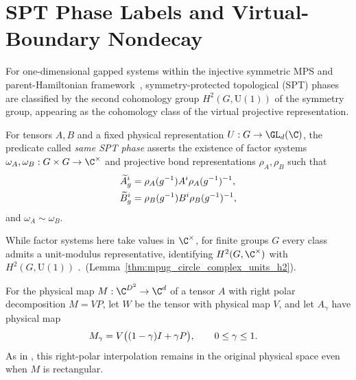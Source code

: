 \section{SPT Phase Labels and Virtual-Boundary Nondecay}

For one-dimensional gapped systems within the injective symmetric MPS and
parent-Hamiltonian framework~\cite{Schuch2011Phases}, symmetry-protected
topological (SPT) phases are classified by the second cohomology group
$H^2(G,\mathrm{U}(1))$ of the symmetry group, appearing as the cohomology class
of the virtual projective representation.

\begin{definition}
    \label{def:is_same_spt_phase}
    \leanok
    For tensors $A,B$ and a fixed physical representation
    $U:G\to\GL_d(\C)$, the predicate called \emph{same SPT phase}
    asserts the existence of factor systems
    $\omega_A,\omega_B:G\times G\to\C^\times$ and projective bond
    representations $\rho_A,\rho_B$ such that
    \begin{align}
        \widetilde A_g^i
         & =\rho_A(g^{-1})A^i\rho_A(g^{-1})^{-1}, \\
        \widetilde B_g^i
         & =\rho_B(g^{-1})B^i\rho_B(g^{-1})^{-1},
        \notag
    \end{align}
    and $\omega_A\sim\omega_B$.
\end{definition}

\begin{remark}
    \label{rem:spt_scalar_character_conventions}
    While factor systems here take values in $\C^\times$, for finite groups $G$
    every class admits a unit-modulus representative, identifying
    $H^2(G,\C^\times)$ with $H^2(G,\mathrm U(1))$%
    \ifftmpsvolume.\else\ (Lemma~\ref{thm:mpug_circle_complex_units_h2}).\fi
\end{remark}

\begin{definition}
    \label{def:spt_polar_deformation}
    \leanok
    For the physical map $M:\C^{D^2}\to\C^d$ of a tensor $A$ with right
    polar decomposition $M=VP$, let $W$ be the tensor with physical map
    $V$, and let $A_\gamma$ have physical map
    \begin{align}
        M_\gamma & =V\bigl((1-\gamma)I+\gamma P\bigr),
        \qquad 0\leq\gamma\leq1.
        \notag
    \end{align}
    As in \cite[Section~II.C]{Schuch2011Phases}, this right-polar
    interpolation remains in the original physical space even when $M$ is
    rectangular.
\end{definition}

